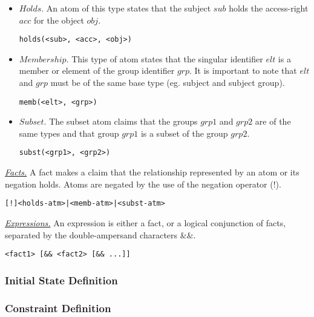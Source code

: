 \documentclass[10pt, twocolumn]{article}
\begin{document}
        \begin{itemize}
          \item
            $Holds$. An atom of this type states that the subject
            $sub$ holds the access-right $acc$ for the object $obj$.

            \begin{verbatim}holds(<sub>, <acc>, <obj>)\end{verbatim}
          \item
            $Membership$. This type of atom states that the singular identifier
            $elt$ is a member or element of the group identifier $grp$. It is
            important to note that $elt$ and $grp$ must be of the same base
            type (eg. subject and subject group).

            \begin{verbatim}memb(<elt>, <grp>)\end{verbatim}
          \item
            $Subset$. The subset atom claims that the groups $grp1$ and $grp2$
            are of the same types and that group $grp1$ is a subset of the
            group $grp2$. 
            \begin{verbatim}subst(<grp1>, <grp2>)\end{verbatim}
        \end{itemize}

        \noindent\underline{\emph{Facts.}} A fact makes a claim that the
        relationship represented by an atom or its negation holds. Atoms
        are negated by the use of the negation operator ($!$).

        \begin{verbatim}[!]<holds-atm>|<memb-atm>|<subst-atm>\end{verbatim}

        \noindent\underline{\emph{Expressions.}} An expression is either a
        fact, or a logical conjunction of facts, separated by the
        double-ampersand characters $\&\&$.

        \begin{verbatim}<fact1> [&& <fact2> [&& ...]]\end{verbatim}

      \subsubsection{Initial State Definition}

      \subsubsection{Constraint Definition}
\end{document}
